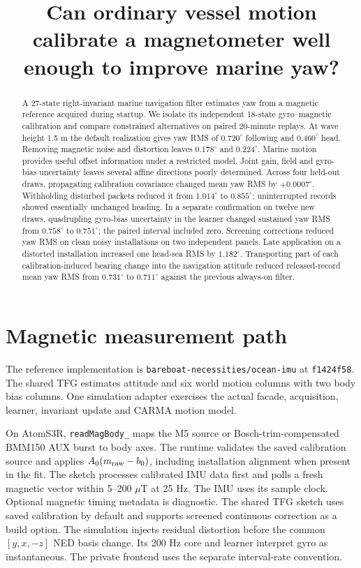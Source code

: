 \documentclass[conference]{IEEEtran}
\begin{document}
\title{Can ordinary vessel motion calibrate a magnetometer well enough to improve marine yaw?}
\author{}
\maketitle
\begin{abstract}
A 27-state right-invariant marine navigation filter estimates yaw from a magnetic reference acquired during startup. We isolate its independent 18-state gyro--magnetic calibration and compare constrained alternatives on paired 20-minute replays. At wave height 1.5 m the default realization gives yaw RMS of $0.720^\circ$ following and $0.460^\circ$ head. Removing magnetic noise and distortion leaves $0.178^\circ$ and $0.224^\circ$. Marine motion provides useful offset information under a restricted model. Joint gain, field and gyro-bias uncertainty leaves several affine directions poorly determined. Across four held-out draws, propagating calibration covariance changed mean yaw RMS by $+0.0007^\circ$. Withholding disturbed packets reduced it from $1.014^\circ$ to $0.855^\circ$; uninterrupted records showed essentially unchanged heading. In a separate confirmation on twelve new draws, quadrupling gyro-bias uncertainty in the learner changed sustained yaw RMS from $0.758^\circ$ to $0.751^\circ$; the paired interval included zero. Screening corrections reduced yaw RMS on clean noisy installations on two independent panels. Late application on a distorted installation increased one head-sea RMS by $1.182^\circ$.
Transporting part of each calibration-induced bearing change into the navigation attitude reduced released-record mean yaw RMS from $0.731^\circ$ to $0.711^\circ$ against the previous always-on filter.
\end{abstract}
\section{Magnetic measurement path}
The reference implementation is \texttt{bareboat-necessities/ocean-imu} at \texttt{f1424f58}. The shared TFG estimates attitude and six world motion columns with two body bias columns. One simulation adapter exercises the actual facade, acquisition, learner, invariant update and CARMA motion model.

On AtomS3R, \texttt{readMagBody\_} maps the M5 source or Bosch-trim-compensated BMM150 AUX burst to body axes. The runtime validates the saved calibration source and applies $A_0(m_{\rm raw}-b_0)$, including installation alignment when present in the fit. The sketch processes calibrated IMU data first and polls a fresh magnetic vector within 5--200 $\mu$T at 25 Hz. The IMU uses its sample clock. Optional magnetic timing metadata is diagnostic. The shared TFG sketch uses saved calibration by default and supports screened continuous correction as a build option. The simulation injects residual distortion before the common $[y,x,-z]$ NED basis change. Its 200 Hz core and learner interpret gyro as instantaneous. The private frontend uses the separate interval-rate convention.
\end{document}
